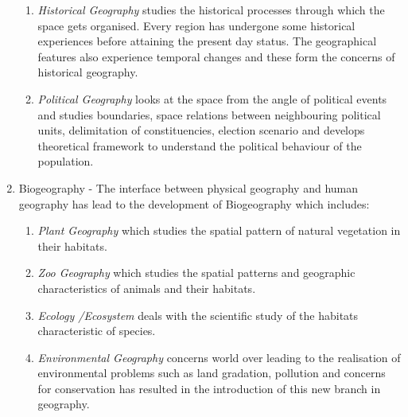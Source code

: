\documentclass[8pt, a4paper, oneside, twocolumn]{extarticle}
\begin{document}
\begin{enumerate}
\begin{enumerate}
    \item \textit{Historical Geography} studies the historical processes through which the space gets organised. Every region has undergone some historical experiences before attaining the present day status. The geographical features also experience temporal changes and these form the concerns of historical geography.
    \item \textit{Political Geography} looks at the space from the angle of political events and studies boundaries, space relations between neighbouring political units, delimitation of constituencies, election scenario and develops theoretical framework to understand the political behaviour of the population.
  \end{enumerate}
  \item Biogeography - The interface between physical geography and human geography has lead to the development of Biogeography which includes:
  \begin{enumerate}
    \item \textit{Plant Geography} which studies the spatial pattern of natural vegetation in their habitats.
    \item \textit{Zoo Geography} which studies the spatial patterns and geographic characteristics of animals and their habitats. 
    \item \textit{Ecology /Ecosystem} deals with the scientific study of the habitats characteristic of species. 
    \item \textit{Environmental Geography} concerns world over leading to the realisation of environmental problems such as land gradation, pollution and concerns for conservation has resulted in the introduction of this new branch in geography.
    
  \end{enumerate}
\end{enumerate}
\end{document}
